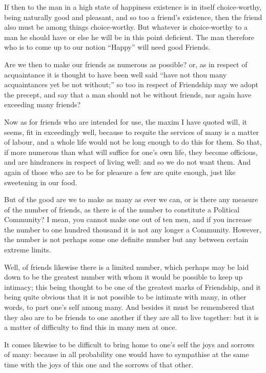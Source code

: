 If then to the man in a high state of happiness existence is in itself
choice-worthy, being naturally good and pleasant, and so too a friend’s
existence, then the friend also must be among things choice-worthy. But
whatever is choice-worthy to a man he should have or else he will be in this
point deficient. The man therefore who is to come up to our notion
“Happy” will need good Friends.


Are we then to make our friends as numerous as possible? or, as in respect of
acquaintance it is thought to have been well said “have not thou many
acquaintances yet be not without;” so too in respect of Friendship may we
adopt the precept, and say that a man should not be without friends, nor again
have exceeding many friends?

Now as for friends who are intended for use, the maxim I have quoted will, it
seems, fit in exceedingly well, because to requite the services of many is a
matter of labour, and a whole life would not be long enough to do this for
them. So that, if more numerous than what will suffice for one’s own
life, they become officious, and are hindrances in respect of living well: and
so we do not want them. And again of those who are to be for pleasure a few are
quite enough, just like sweetening in our food.

But of the good are we to make as many as ever we can, or is there any measure
of the number of friends, as there is of the number to constitute a Political
Community? I mean, you cannot make one out of ten men, and if you increase the
number to one hundred thousand it is not any longer a Community. However, the
number is not perhaps some one definite number but any between certain extreme
limits.

Well, of friends likewise there is a limited number, which perhaps may be laid
down to be the greatest number with whom it would be possible to keep up
intimacy; this being thought to be one of the greatest marks of Friendship, and
it being quite obvious that it is not possible to be intimate with many, in
other words, to part one’s self among many. And besides it must be
remembered that they also are to be friends to one another if they are all to
live together: but it is a matter of difficulty to find this in many men at
once.

It comes likewise to be difficult to bring home to one’s self the joys
and sorrows of many: because in all probability one would have to sympathise at
the same time with the joys of this one and the sorrows of that other.

